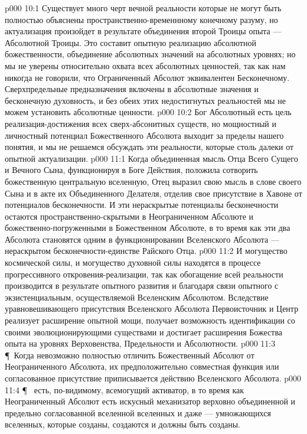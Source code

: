 \vs p000 10:1 Существует много черт вечной реальности  которые не могут быть полностью объяснены пространственно\hyp{}временнному конечному разуму, но актуализация  произойдет в результате объединения второй Троицы опыта --- Абсолютной Троицы. Это составит опытную реализацию абсолютной божественности, объединение абсолютных значений на абсолютных уровнях; но мы не уверены относительно охвата всех абсолютных ценностей, так как нам никогда не говорили, что Ограниченный Абсолют эквивалентен Бесконечному. Сверхпредельные предназначения включены в абсолютные значения и бесконечную духовность, и без обеих этих недостигнутых реальностей мы не можем установить абсолютные ценности.
\vs p000 10:2 Бог Абсолютный есть цель реализация\hyp{}достижения всех сверх\hyp{}абсонитных существ, но мощностный и личностный потенциал Божественного Абсолюта выходит за пределы нашего понятия, и мы не решаемся обсуждать эти реальности, которые столь далеки от опытной актуализации.
\vs p000 11:1 Когда объединенная мысль Отца Всего Сущего и Вечного Сына, функционируя в Боге Действия, положила сотворить божественную центральную вселенную, Отец выразил свою мысль в слове своего Сына и в акте их Объединенного Делателя, отделив свое присутствие в Хавоне от потенциалов бесконечности. И эти нераскрытые потенциалы бесконечности остаются пространственно\hyp{}скрытыми в Неограниченном Абсолюте и божественно\hyp{}погруженными в Божественном Абсолюте, в то время как эти два Абсолюта становятся одним в функционировании Вселенского Абсолюта --- нераскрытом бесконечности\hyp{}единстве Райского Отца.
\vs p000 11:2 И могущество космической силы, и могущество духовной силы находятся в процессе прогрессивного откровения\hyp{}реализации, так как обогащение всей реальности производится в результате опытного развития и благодаря связи опытного с экзистенциальным, осуществляемой Вселенским Абсолютом. Вследствие уравновешивающего присутствия Вселенского Абсолюта Первоисточник и Центр реализует расширение опытной мощи, получает возможность идентификации со своими эволюционирующими существами и достигает расширения Божества опыта на уровнях Верховенства, Предельности и Абсолютности.
\vs p000 11:3 \P\ Когда невозможно полностью отличить Божественный Абсолют от Неограниченного Абсолюта, их предположительно совместная функция или согласованное присутствие приписывается действию Вселенского Абсолюта.
\vs p000 11:4 \P\ \bibnobreakspace {} есть, по\hyp{}видимому, всемогущий активатор, в то время как Неограниченный Абсолют есть искусный механизатор верховно объединенной и предельно согласованной вселенной вселенных и даже --- умножающихся вселенных, которые созданы, создаются и должны быть созданы.
